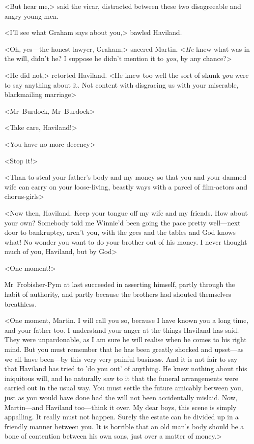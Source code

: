 <But hear me,> said the vicar, distracted between these two disagreeable and angry young men.

<I'll see what Graham says about you,> bawled Haviland.

<Oh, yes—the honest lawyer, Graham,> sneered Martin. <\textit{He} knew what was in the will, didn't he? I suppose he didn't mention it to \textit{you}, by any chance?>

<He did not,> retorted Haviland. <He knew too well the sort of skunk \textit{you} were to say anything about it. Not content with disgracing us with your miserable, blackmailing marriage\longdash>

<Mr~Burdock, Mr~Burdock\longdash>

<Take care, Haviland!>

<You have no more decency\longdash>

<Stop it!>

<Than to steal your father's body and my money so that you and your damned wife can carry on your loose-living, beastly ways with a parcel of film-actors and chorus-girls\longdash>

<Now then, Haviland. Keep your tongue off my wife and my friends. How about your own? Somebody told me Winnie'd been going the pace pretty well—next door to bankruptcy, aren't you, with the gees and the tables and God knows what! No wonder you want to do your brother out of his money. I never thought much of you, Haviland, but by God\longdash>

<One moment!>

Mr~Frobisher-Pym at last succeeded in asserting himself, partly through the habit of authority, and partly because the brothers had shouted themselves breathless.

<One moment, Martin. I will call you so, because I have known you a long time, and your father too. I understand your anger at the things Haviland has said. They were unpardonable, as I am sure he will realise when he comes to his right mind. But you must remember that he has been greatly shocked and upset—as we all have been—by this very very painful business. And it is not fair to say that Haviland has tried to 'do you out' of anything. He knew nothing about this iniquitous will, and he naturally saw to it that the funeral arrangements were carried out in the usual way. You must settle the future amicably between you, just as you would have done had the will not been accidentally mislaid. Now, Martin—and Haviland too—think it over. My dear boys, this scene is simply appalling. It really must not happen. Surely the estate can be divided up in a friendly manner between you. It is horrible that an old man's body should be a bone of contention between his own sons, just over a matter of money.>

